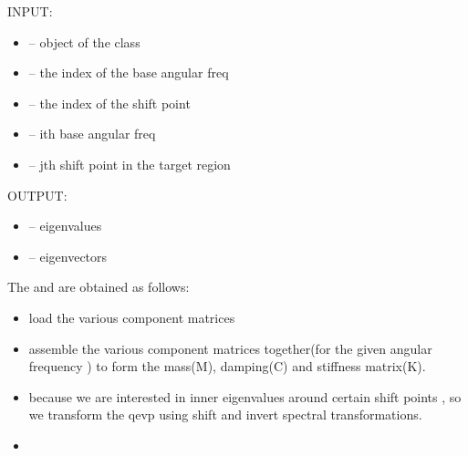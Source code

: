 \documentclass[letterpaper,10pt,english]{sphinxmanual}
\begin{document}
\begin{fulllineitems}
\label{index:qevp.Obtain_eigs}
INPUT:
\begin{itemize}
\item {} 
 -- object of the class 

\item {} 
 -- the index of the base angular freq

\item {} 
 -- the index of the shift point

\item {} 
 -- ith base angular freq

\item {} 
 -- jth shift point in the target region

\end{itemize}

OUTPUT:
\begin{itemize}
\item {} 
 -- eigenvalues

\item {} 
 -- eigenvectors

\end{itemize}

The  and  are obtained as follows:
\begin{itemize}
\item {} 
load the various component matrices

\item {} 
assemble the various component matrices together(for the given angular frequency
) to form the mass(M), damping(C) and stiffness matrix(K).

\item {} 
because we are interested in inner eigenvalues around certain shift points
, so we transform the qevp using shift and invert spectral
transformations.

\item {} 
\end{itemize}

\end{fulllineitems}

\end{document}
